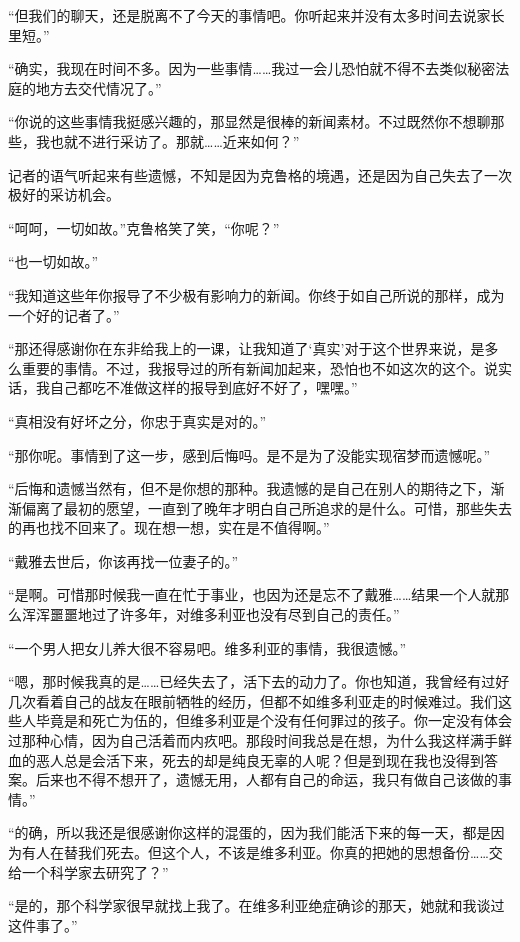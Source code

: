 “但我们的聊天，还是脱离不了今天的事情吧。你听起来并没有太多时间去说家长里短。”

“确实，我现在时间不多。因为一些事情……我过一会儿恐怕就不得不去类似秘密法庭的地方去交代情况了。”

“你说的这些事情我挺感兴趣的，那显然是很棒的新闻素材。不过既然你不想聊那些，我也就不进行采访了。那就……近来如何？”

记者的语气听起来有些遗憾，不知是因为克鲁格的境遇，还是因为自己失去了一次极好的采访机会。

“呵呵，一切如故。”克鲁格笑了笑，“你呢？”

“也一切如故。”

“我知道这些年你报导了不少极有影响力的新闻。你终于如自己所说的那样，成为一个好的记者了。”

“那还得感谢你在东非给我上的一课，让我知道了‘真实’对于这个世界来说，是多么重要的事情。不过，我报导过的所有新闻加起来，恐怕也不如这次的这个。说实话，我自己都吃不准做这样的报导到底好不好了，嘿嘿。”

“真相没有好坏之分，你忠于真实是对的。”

“那你呢。事情到了这一步，感到后悔吗。是不是为了没能实现宿梦而遗憾呢。”

“后悔和遗憾当然有，但不是你想的那种。我遗憾的是自己在别人的期待之下，渐渐偏离了最初的愿望，一直到了晚年才明白自己所追求的是什么。可惜，那些失去的再也找不回来了。现在想一想，实在是不值得啊。”

“戴雅去世后，你该再找一位妻子的。”

“是啊。可惜那时候我一直在忙于事业，也因为还是忘不了戴雅……结果一个人就那么浑浑噩噩地过了许多年，对维多利亚也没有尽到自己的责任。”

“一个男人把女儿养大很不容易吧。维多利亚的事情，我很遗憾。”

“嗯，那时候我真的是……已经失去了，活下去的动力了。你也知道，我曾经有过好几次看着自己的战友在眼前牺牲的经历，但都不如维多利亚走的时候难过。我们这些人毕竟是和死亡为伍的，但维多利亚是个没有任何罪过的孩子。你一定没有体会过那种心情，因为自己活着而内疚吧。那段时间我总是在想，为什么我这样满手鲜血的恶人总是会活下来，死去的却是纯良无辜的人呢？但是到现在我也没得到答案。后来也不得不想开了，遗憾无用，人都有自己的命运，我只有做自己该做的事情。”

“的确，所以我还是很感谢你这样的混蛋的，因为我们能活下来的每一天，都是因为有人在替我们死去。但这个人，不该是维多利亚。你真的把她的思想备份……交给一个科学家去研究了？”

“是的，那个科学家很早就找上我了。在维多利亚绝症确诊的那天，她就和我谈过这件事了。”

